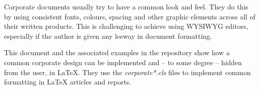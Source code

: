 Corporate documents usually try to have a common look and feel. They do this by using consistent fonts, colours, spacing and other graphic elements across all of their written products. This is challenging to achieve using WYSIWYG editors, especially if the author is given any leeway in document formatting.

This document and the associated examples in the repository show how a common corporate design can be implemented and -- to some degree -- hidden from the user, in LaTeX. They use the \emph{corporate*.cls} files to implement common formatting in LaTeX articles and reports.